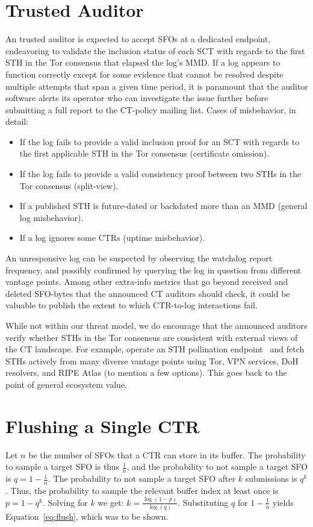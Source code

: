 \section{Trusted Auditor} \label{app:auditor}
An trusted auditor is expected to accept SFOs at a dedicated endpoint,
endeavoring to validate the inclusion status of each SCT with regards to the
first STH in the Tor consensus that elapsed the log's MMD.  If a log appears to
function correctly except for some evidence that cannot be
resolved despite multiple attempts that span a given time period, it is
paramount that the auditor software alerts its operator who can investigate
the issue further before submitting a full report to the CT-policy mailing list.
Cases of misbehavior, in detail:
\begin{itemize}
	\item If the log fails to provide a valid inclusion proof for an SCT with
		regards to the first applicable STH in the Tor consensus
		(certificate omission).
	\item If the log fails to provide a valid consistency proof between two
		STHs in the Tor consensus
		(split-view).
	\item If a published STH is future-dated or backdated more than an MMD
		(general log misbehavior).
	\item If a log ignores some CTRs (uptime misbehavior).
\end{itemize}

An unresponsive log can be suspected by observing the watchdog report frequency,
and possibly confirmed by querying the log in question from different vantage
points.  Among other extra-info metrics that go beyond received and deleted
SFO-bytes that the announced CT auditors should check, it could be valuable to
publish the extent to which CTR-to-log interactions fail.

While not within our threat model, we do encourage that the announced auditors
verify whether STHs in the Tor consensus are consistent with external views of
the CT landscape.  For example, operate an STH pollination
endpoint~\cite{nordberg} and fetch STHs actively from many diverse vantage
points using Tor, VPN services, DoH resolvers, and RIPE Atlas (to mention a few
options).  This goes back to the point of general ecosystem value.

\section{Flushing a Single CTR} \label{app:flush}
Let $n$ be the number of SFOs that a CTR can store in its buffer.  The
probability to sample a target SFO is thus $\frac{1}{n}$, and the probability to
not sample a target SFO is $q = 1 - \frac{1}{n}$.  The probability to not sample
a target SFO after $k$ submissions is $q^k$.  Thus, the probability to sample
the relevant buffer index at least once is $p = 1 - q^k$.  Solving for $k$ we
get: $k = \frac{\log(1 - p)}{\log(q)}$.  Substituting $q$ for $1 - \frac{1}{n}$
yields Equation~\ref{eq:flush}, which was to be shown.